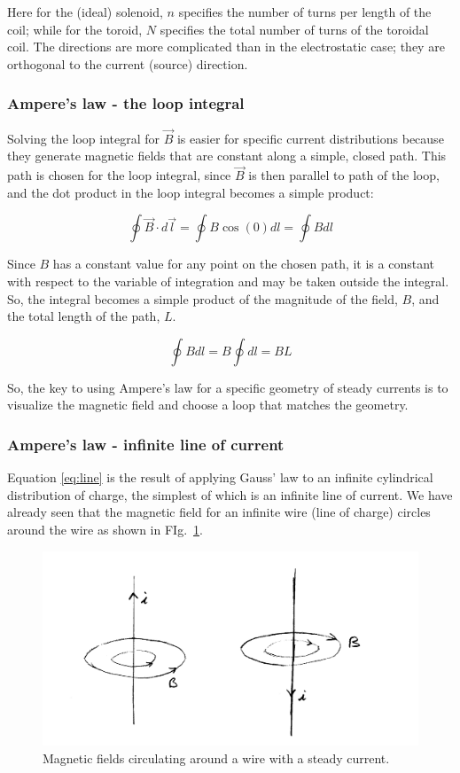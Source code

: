 \documentclass[12pt]{article}
\begin{document}
\begin{flushleft}
Here for the (ideal) solenoid, $n$ specifies the number of turns per length of the coil; while for the toroid, $N$ specifies the total number of turns of the toroidal coil.  The directions are more complicated than in the electrostatic case; they are orthogonal to the current (source) direction.

\subsubsection*{\bf Ampere's law - the loop integral}

Solving the loop integral for $\vec{B}$ is easier for specific current distributions because they generate magnetic fields that are constant along a simple, closed path.  This path is chosen for the loop integral, since $\vec{B}$ is then parallel to path of the loop, and the dot product in the loop integral becomes a simple product:

\[
\oint \vec{B} \cdot d\vec{l} = \oint B \cos{(0)} dl = \oint B dl
\]  

Since $B$ has a constant value for any point on the chosen path, it is a constant with respect to the variable of integration and may be taken outside the integral.  So, the integral becomes a simple product of the magnitude of the field, $B$, and the total length of the path, $L$.

\[
\oint B dl = B \oint dl = BL
\]  

So, the key to using Ampere's law for a specific geometry of steady currents is to visualize the magnetic field and choose a loop that matches the geometry. 

\subsubsection*{\bf Ampere's law - infinite line of current}

Equation \ref{eq:line} is the result of applying Gauss' law to an infinite cylindrical distribution of charge, the simplest of which is an infinite line of current.  We have already seen that the magnetic field for an infinite wire (line of charge) circles around the wire as shown in FIg.~\ref{fig:wire}.

\begin{figure}[h]
\centering
\includegraphics*[trim=1cm 0cm 0cm 0cm, clip=true, width=0.6\columnwidth]{B_longwires.png}
\caption{\small Magnetic fields circulating around a wire with a steady current.}
\label{fig:wire}
\end{figure}


\end{flushleft}
\end{document}
